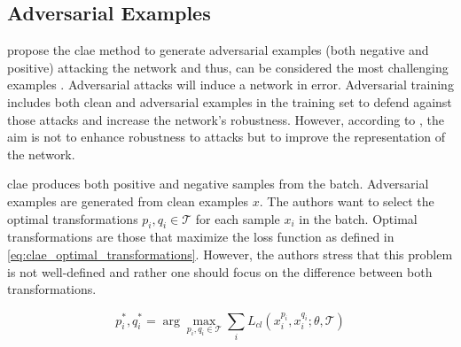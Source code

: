 \subsection{Adversarial Examples}\label{subsec:adversarial_examples}

\citeauthor{ho_contrastive_2020} propose the \ac{clae} method to generate adversarial examples 
(both negative and positive) attacking the network and thus,
can be considered the most challenging examples \cite{ho_contrastive_2020}.
Adversarial attacks will induce a network in error.
Adversarial training includes both clean and adversarial examples in the training set to defend against those attacks and 
increase the network's robustness.
However, according to \citeauthor{ho_contrastive_2020}, the aim is not to enhance robustness to attacks 
but to improve the representation of the network.

\ac{clae} produces both positive and negative samples from the batch.
Adversarial examples are generated from clean examples $x$.
The authors want to select the optimal transformations $p_i, q_i \in \mathcal{T}$ for each sample $x_i$ in the batch.
Optimal transformations are those that maximize the loss function as defined in \eqref{eq:clae_optimal_transformations}.
However, the authors stress that this problem is not well-defined and 
rather one should focus on the difference between both transformations.

\begin{equation}
    {p^*_i, q^*_i} = \arg\max_{p_i, q_i \in \mathcal{T}} \sum_{i}^{}L_{cl}(x_i^{p_i}, x_i^{q_i}; \theta, \mathcal{T})
    \label{eq:clae_optimal_transformations}
\end{equation}